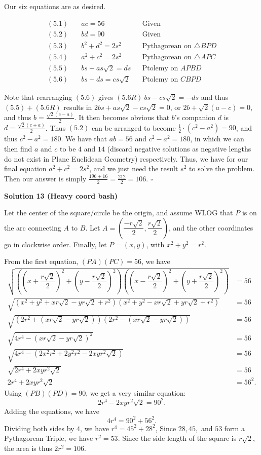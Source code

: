 \begin{enumerate}
 Our six equations are as desired.

 \begin{align}(5.1)\quad & ac = 56 && \text{Given} \\(5.2)\quad & bd = 90 && \text{Given} \\(5.3)\quad & b^2 + d^2 = 2s^2 && \text{Pythagorean on } \triangle BPD \\(5.4)\quad & a^2 + c^2 = 2s^2 && \text{Pythagorean on } \triangle APC \\(5.5)\quad & bs + as\sqrt{2} = ds && \text{Ptolemy on } APBD \\(5.6)\quad & bs + ds = cs\sqrt{2} && \text{Ptolemy on } CBPD\end{align}

 Note that rearranging $(5.6)$ gives $(5.6R)~bs - cs\sqrt{2} = -ds$ and thus $(5.5) + (5.6R)$ results in $2bs + as\sqrt{2} - cs\sqrt{2} = 0$, or $2b + \sqrt{2}(a-c) = 0$, and thus $b = \frac{\sqrt{2}(c-a)}{2}$. It then becomes obvious that $b$'s companion $d$ is $d = \frac{\sqrt{2}(c+a)}{2}$. Thus $(5.2)$ can be arranged to become $\frac{1}{2} \cdot (c^2 - a^2) = 90$, and thus $c^2 -  a^2 = 180$. We have that $ab = 56$ and $c^2 - a^2 = 180$, in which we can then find $a$ and $c$ to be $4$ and $14$ (discard negative solutions as negative lengths do not exist in Plane Euclidean Geometry) respectively. Thus, we have for our final equation $a^2 + c^2 = 2s^2$, and we just need the result $s^2$ to solve the problem. Then our answer is simply $\frac{196+16}{2} = \frac{212}{2} = \boxed{106}$. $\square$




\textbf{Solution 13 (Heavy coord bash)}

Let the center of the square/circle be the origin, and assume WLOG that $P$ is on the arc connecting $A$ to $B$. Let $A=\left(\dfrac{-r\sqrt{2}}{2},\dfrac{r\sqrt{2}}{2}\right)$, and the other coordinates go in clockwise order. Finally, let $P=(x,y)$, with $x^2+y^2=r^2$.

 From the first equation, $(PA)(PC)=56$, we have\begin{align*}\sqrt{\left(\left(x+\dfrac{r\sqrt2}{2}\right)^2+\left(y-\dfrac{r\sqrt2}{2}\right)^2\right)\left(\left(x-\dfrac{r\sqrt2}{2}\right)^2+\left(y+\dfrac{r\sqrt2}{2}\right)^2\right)}&=56\\\sqrt{(x^2+y^2+xr\sqrt2-yr\sqrt2+r^2)(x^2+y^2-xr\sqrt2+yr\sqrt2+r^2)}&=56\\\sqrt{(2r^2+(xr\sqrt2-yr\sqrt2))(2r^2-(xr\sqrt2-yr\sqrt2))}&=56\\\sqrt{4r^4-(xr\sqrt2-yr\sqrt2)^2}&=56\\\sqrt{4r^4-(2x^2r^2+2y^2r^2-2xyr^2\sqrt2)}&=56\\\sqrt{2r^4+2xyr^2\sqrt2}&=56\\2r^4+2xyr^2\sqrt2&=56^2.\end{align*}
Using $(PB)(PD)=90$, we get a very similar equation:
 \[2r^4-2xyr^2\sqrt2=90^2.\]Adding the equations, we have
 \[4r^4=90^2+56^2.\]Dividing both sides by $4$, we have $r^4=45^2+28^2$, Since $28,45,$ and $53$ form a Pythagorean Triple, we have $r^2=53$. Since the side length of the square is $r\sqrt2$, the area is thus $2r^2=\boxed{106}.$





\end{enumerate}
